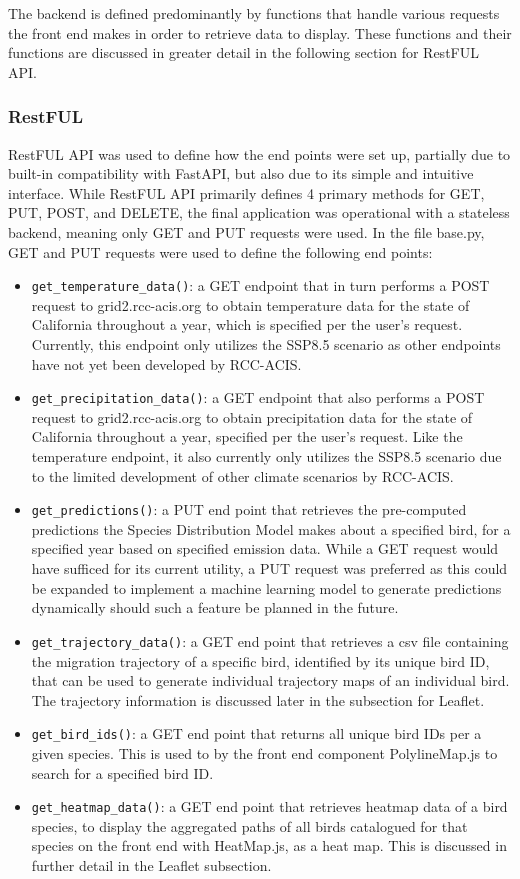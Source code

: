 \documentclass{article}
\begin{document}
The backend is defined predominantly by functions that handle various requests the front end makes in order to retrieve data to display. These functions and their functions are discussed in greater detail in the following section for RestFUL API.

\subsubsection{RestFUL}
RestFUL API was used to define how the end points were set up, partially due to built-in compatibility with FastAPI, but also due to its simple and intuitive interface. While RestFUL API primarily defines 4 primary methods for GET, PUT, POST, and DELETE, the final application was operational with a stateless backend, meaning only GET and PUT requests were used.
In the file base.py, GET and PUT requests were used to define the following end points:

\begin{itemize}
	\item \texttt{get\_temperature\_data()}: a GET endpoint that in turn performs a POST request to grid2.rcc-acis.org to obtain temperature data for the state of California throughout a year, which is specified per the user's request. Currently, this endpoint only utilizes the SSP8.5 scenario as other endpoints have not yet been developed by RCC-ACIS.
   	 \item \texttt{get\_precipitation\_data()}: a GET endpoint that also performs a POST request to grid2.rcc-acis.org to obtain precipitation data for the state of California throughout a year, specified per the user's request. Like the temperature endpoint, it also currently only utilizes the SSP8.5 scenario due to the limited development of other climate scenarios by RCC-ACIS.
	\item \texttt{get\_predictions()}: a PUT end point that retrieves the pre-computed predictions the Species Distribution Model makes about a specified bird, for a specified year based on specified emission data. While a GET request would have sufficed for its current utility, a PUT request was preferred as this could be expanded to implement a machine learning model to generate predictions dynamically should such a feature be planned in the future.
	\item \texttt{get\_trajectory\_data()}: a GET end point that retrieves a csv file containing the migration trajectory of a specific bird, identified by its unique bird ID, that can be used to generate individual trajectory maps of an individual bird. The trajectory information is discussed later in the subsection for Leaflet.
	\item \texttt{get\_bird\_ids()}: a GET end point that returns all unique bird IDs per a given species. This is used to by the front end component PolylineMap.js to search for a specified bird ID.
	\item \texttt{get\_heatmap\_data()}: a GET end point that retrieves heatmap data of a bird species, to display the aggregated paths of all birds catalogued for that species on the front end with HeatMap.js, as a heat map. This is discussed in further detail in the Leaflet subsection.
\end{itemize}
\end{document}
